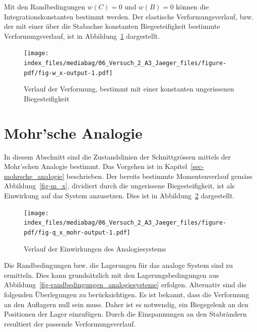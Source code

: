 \documentclass[
  12pt,
  letterpaper,
  egregdoesnotlikesansseriftitles]{scrreprt}
\begin{document}
Mit den Randbedingungen \(w(C) = 0\) und \(w(B) = 0\) können die
Integrationskonstanten bestimmt werden. Der elastische
Verformungsverlauf, bzw. der mit einer über die Stabachse konstanten
Biegesteifigkeit bestimmte Verformungsverlauf, ist in
Abbildung~\ref{fig-w_x} dargestellt.

\begin{figure}[H]

{\centering \texttt{[image: index\_files/mediabag/06\_Versuch\_2\_A3\_Jaeger\_files/figure-pdf/fig-w\_x-output-1.pdf]}

}

\caption{\label{fig-w_x}Verlauf der Verformung, bestimmt mit einer
konstanten ungerissenen Biegesteifigkeit}

\end{figure}

\hypertarget{mohrsche-analogie}{%
\section{Mohr'sche Analogie}\label{mohrsche-analogie}}

In diesem Abschnitt sind die Zustandslinien der Schnittgrössen mittels
der Mohr'schen Analogie bestimmt. Das Vorgehen ist in
Kapitel~\ref{sec-mohrsche_analogie} beschrieben. Der bereits bestimmte
Momentenverlauf gemäss Abbildung~\ref{fig-m_x}, dividiert durch die
ungerissene Biegesteifigkeit, ist als Einwirkung auf das System
anzusetzen. Dies ist in Abbildung~\ref{fig-q_x_mohr} dargestellt.

\begin{figure}[H]

{\centering \texttt{[image: index\_files/mediabag/06\_Versuch\_2\_A3\_Jaeger\_files/figure-pdf/fig-q\_x\_mohr-output-1.pdf]}

}

\caption{\label{fig-q_x_mohr}Verlauf der Einwirkungen des
Analogiesystems}

\end{figure}

Die Randbedingungen bzw. die Lagerungen für das analoge System sind zu
ermitteln. Dies kann grundsätzlich mit den Lagerungsbedingungen aus
Abbildung~\ref{fig-randbedingungen_analogiesysteme} erfolgen. Alternativ
sind die folgenden Überlegungen zu berücksichtigen. Es ist bekannt, dass
die Verformung an den Auflagern null sein muss. Daher ist es notwendig,
ein Biegegelenk an den Positionen der Lager einzufügen. Durch die
Einspannungen an den Stabrändern resultiert der passende
Verformungsverlauf.
\end{document}
